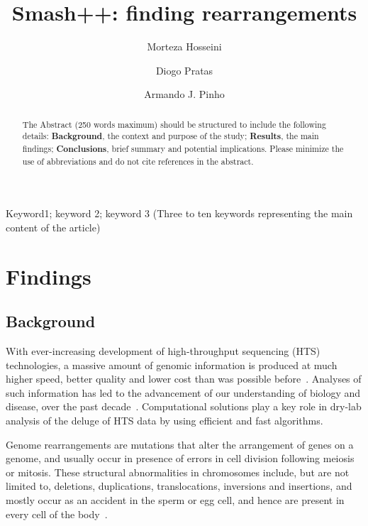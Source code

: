 \documentclass[a4paper,num-refs]{oup-contemporary}
\title{Smash++: finding rearrangements}
\author[1,\authfn{1}]{Morteza Hosseini}
\author[2,\authfn{1}]{Diogo Pratas}
\author[2,\authfn{1}]{Armando J. Pinho}
\affil[1,2]{IEETA/DETI, University of Aveiro, Portugal}
\begin{document}
\begin{frontmatter}
\maketitle
\begin{abstract}
The Abstract (250 words maximum) should be structured to include the following details: \textbf{Background}, the context and purpose of the study; \textbf{Results}, the main findings; \textbf{Conclusions}, brief summary and potential implications. Please minimize the use of abbreviations and do not cite references in the abstract.
\end{abstract}

\begin{keywords}
Keyword1; keyword 2; keyword 3 (Three to ten keywords representing the main content of the article)
\end{keywords}
\end{frontmatter}


\section{Findings}

\subsection{Background}
With ever-increasing development of high-throughput sequencing (HTS) technologies, a massive amount of genomic information is produced at much higher speed, better quality and lower cost than was possible before~\cite{reuter2015high}. Analyses of such information has led to the advancement of our understanding of biology and disease, over the past decade~\cite{villamor2019high,rego2019high}. Computational solutions play a key role in dry-lab analysis of the deluge of HTS data by using efficient and fast algorithms.

Genome rearrangements are mutations that alter the arrangement of genes on a genome, and usually occur in presence of errors in cell division following meiosis or mitosis. These structural abnormalities in chromosomes include, but are not limited to, deletions, duplications, translocations, inversions and insertions, and mostly occur as an accident in the sperm or egg cell, and hence are present in every cell of the body~\cite{hartmann2018genome,gardner2018gardner}.
\end{document}
